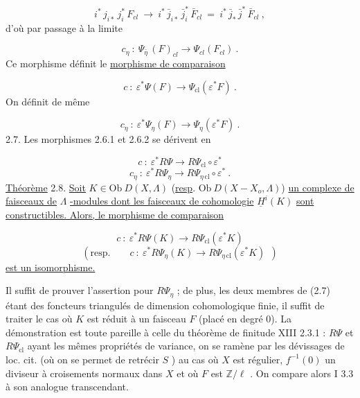 \begin{equation*}
i^* \, j_{i*} \, j_i^* \, F_{cl} \ \longrightarrow \ i^* \, \bar{j}_{i*} \, \bar{j}_i^* \, \bar{F}_{cl} \ = \ i^* \, \bar{j}_* \, \bar{j}^* \, \bar{F}_{cl} \ ,
\end{equation*}
d'où par passage à la limite

\begin{equation*}
c_\eta \ : \ \Psi_{\bar{\eta}} \, (F)_{cl} \longrightarrow \Psi_{cl}(F_{cl}) \ .
\end{equation*}
Ce morphisme définit le \underline{morphisme de comparaison} 



\begin{equation}\tag{2.6.1}
c \ : \ \varepsilon^* \Psi(F) \longrightarrow \Psi_{\mathrm{cl}}(\varepsilon^* F) \ .
\end{equation}
On définit de même

\begin{equation}\tag{2.6.2}
c_\eta \ : \ \varepsilon^* \Psi_\eta(F) \longrightarrow \Psi_\eta(\varepsilon^* F) \ .
\end{equation}
2.7. Les morphismes 2.6.1 et 2.6.2 se dérivent en

\begin{equation*}
c \ : \ \varepsilon^* R\Psi \longrightarrow R\Psi_{\mathrm{cl}} \circ \varepsilon^*
\end{equation*}
\begin{equation*}
c_\eta \ : \ \varepsilon^* R\Psi_\eta \longrightarrow R\Psi_{\eta\,\mathrm{cl}} \circ \varepsilon^* \ .
\end{equation*}
\underline{Théorème} 2.8. \underline{Soit} $K \in \mathrm{Ob}\ D(X, \Lambda)$ (\underline{resp}. $\mathrm{Ob}\ D(X-X_o, \Lambda)$) \underline{un complexe de faisceaux de} $\Lambda$ \underline{-modules dont les faisceaux de cohomologie} $\underline{H}^i(K)$ \underline{sont constructibles. Alors, le morphisme de comparaison}

\begin{equation*}
c \ : \ \varepsilon^* R\Psi(K) \longrightarrow R\Psi_{\mathrm{cl}}(\varepsilon^* K)
\end{equation*}
\begin{equation*}
(\mathrm{resp.} \qquad c \ : \ \varepsilon^* R\Psi_\eta(K) \longrightarrow R\Psi_{\eta\,\mathrm{cl}}(\varepsilon^* K) \ \ )
\end{equation*}
\underline{est un isomorphisme.}

Il suffit de prouver l'assertion pour $R\Psi_\eta$ ; de plus, les deux membres de (2.7) étant des foncteurs triangulés de dimension cohomologique finie, il suffit de traiter le cas où $K$ est réduit à un faisceau $F$ (placé en degré $0$). La démonstration est toute pareille à celle du théorème de finitude XIII 2.3.1 : $R\Psi$ et $R\Psi_{\mathrm{cl}}$ ayant les mêmes propriétés de variance, on se ramène par les dévissages de loc. cit. (où on se permet de retrécir $S$ ) au cas où $X$ est régulier, $f^{-1}(0)$ un diviseur à croisements normaux dans $X$ et où $F$ est $\mathbb{Z}/\ell$ . On compare alors I 3.3 à son analogue transcendant.


